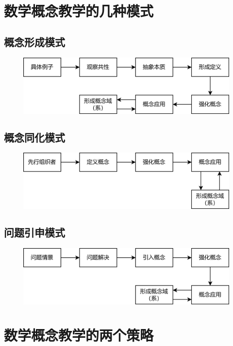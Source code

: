 \section{数学概念教学的几种模式}

\subsection{概念形成模式}

\begin{figure}[H]
    \centering
    \includegraphics[width=0.5\linewidth]{image/概念形成模式.png}
\end{figure}

\subsection{概念同化模式}

\begin{figure}[H]
    \centering
    \includegraphics[width=0.5\linewidth]{image/概念同化模式.png}
\end{figure}

\subsection{问题引申模式}

\begin{figure}[H]
    \centering
    \includegraphics[width=0.5\linewidth]{image/问题引申模式.png}
\end{figure}

\section{数学概念教学的两个策略}


